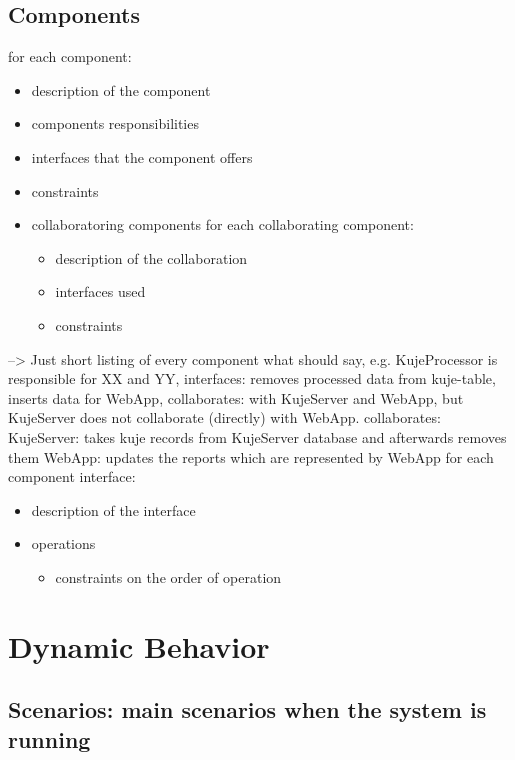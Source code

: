 \documentclass[11pt]{article}
\begin{document}
\subsection{Components}
\label{sec-3.2}

   for each component:
\begin{itemize}
\item description of the component
\item components responsibilities
\item interfaces that the component offers
\item constraints
\item collaboratoring components
                  for each collaborating component:

\begin{itemize}
\item description of the collaboration
\item interfaces used
\item constraints
\end{itemize}

\end{itemize}
   --> Just short listing of every component what should say,
   e.g.
   KujeProcessor is responsible for XX and YY, 
   interfaces: removes processed data from kuje-table, inserts data for WebApp,
   collaborates: with KujeServer and WebApp, but KujeServer does not
   collaborate (directly) with WebApp.
   collaborates:
   KujeServer: takes kuje records from KujeServer database and afterwards
   removes them
   WebApp: updates the reports which are represented by WebApp
   for each component interface:
\begin{itemize}
\item description of the interface
\item operations

\begin{itemize}
\item constraints on the order of operation
\end{itemize}

\end{itemize}
\section{Dynamic Behavior}
\label{sec-4}

\subsection{Scenarios: main scenarios when the system is running}
\label{sec-4.1}
\end{document}
